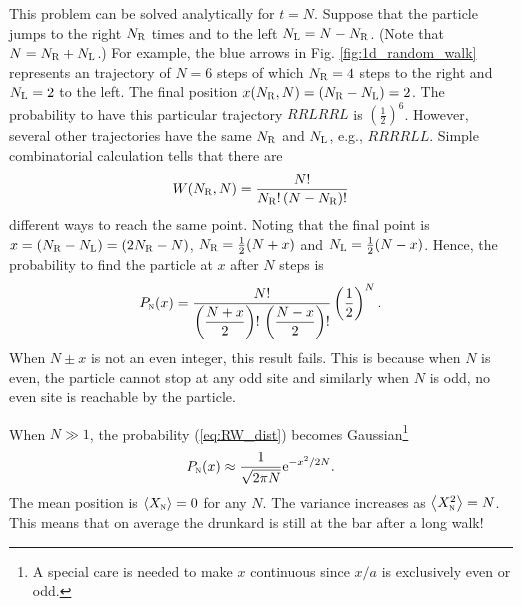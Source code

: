 This problem can be solved analytically for $t=N$.  Suppose that the particle jumps to the right $N_\textsc{R}$  times and to the left $N_\textsc{L}=N-N_\textsc{R}$. (Note that $N=N_\textsc{R}+N_\textsc{L}$.)
For example, the blue arrows in Fig. \ref{fig:1d_random_walk} represents an trajectory of $N=6$ steps of which $N_\textsc{R}=4$ steps to the right and $N_\textsc{L}=2$ to the left. The final position $x(N_\textsc{R},N)=(N_\textsc{R}-N_\textsc{L}) = 2$.  The probability to have this particular trajectory $RRLRRL$ is $\left (\displaystyle \frac{1}{2} \right )^6$.  However, several other trajectories have the same $N_\textsc{R}$ and 
$N_\textsc{L}$, e.g., $RRRRLL$.  Simple combinatorial calculation tells that there are
\begin{equation}
W(N_\textsc{R},N) = \frac{N!}{N_\textsc{R}!\, (N-N_\textsc{R})!}
\end{equation}
different ways to reach the same point. Noting that the final point is $x=(N_\textsc{R}-N_\textsc{L})=(2 N_\textsc{R}-N)$, $N_\textsc{R}=\frac{1}{2} (N+x)$ and $N_\textsc{L}=\frac{1}{2} (N-x)$. Hence, the probability to find the particle at $x$ after $N$ steps is
\begin{equation}\label{eq:RW_dist}
P_\textsc{n}(x) = \frac{N!}{\left (\displaystyle\frac{N+x}{2} \right)!\, \left (\displaystyle\frac{N-x}{2} \right)!} \left ( \frac{1}{2} \right )^N.
\end{equation}
When $N\pm x$ is not an even integer, this result fails. This is because when $N$ is even, the particle cannot stop at any odd site and similarly when $N$ is odd, no even site is reachable by the particle.

When $N \gg 1$, the probability (\ref{eq:RW_dist}) becomes Gaussian\footnote{A special care is needed to make $x$ continuous since $x/a$ is exclusively even or odd.}
\begin{equation}
P_\textsc{n}(x)  \approx \frac{1}{\sqrt{2\pi N}}\text{e}^{-x^2/2N}.
\end{equation}
The mean position is $\expval{X_\textsc{n}}=0$ for any $N$.  The variance increases as $\expval{X_\textsc{n}^2}=N$.  This means that on average the drunkard is still at the bar after a long walk!



